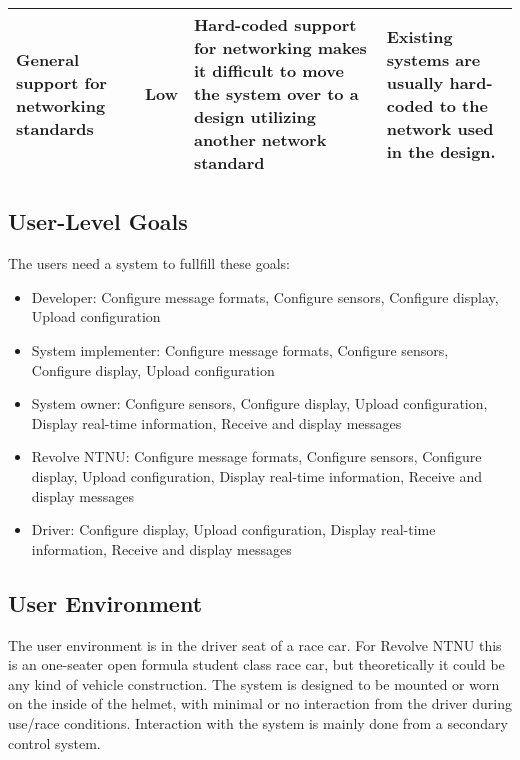 \begin{table}\small
\begin{tabularx}{\textwidth}{|X|l|X|X|}
        \hline
	General support for networking standards
		& Low
			& Hard-coded support for networking makes it difficult to move the system
			over to a design utilizing another network standard
				& Existing systems are usually hard-coded to the network used in the
				design. \\
	\hline
\end{tabularx}
\end{table}
\clearpage

\subsection{User-Level Goals}
The users need a system to fullfill these goals:
\begin{itemize}
	\item Developer: Configure message formats, Configure sensors, Configure
	display, Upload configuration
	\item System implementer: Configure message formats, Configure sensors, Configure
	display, Upload configuration
	\item System owner: Configure sensors, Configure
	display, Upload configuration, Display real-time information, Receive and display messages
	\item Revolve NTNU: Configure message formats, Configure sensors, Configure
	display, Upload configuration, Display real-time information, Receive and display messages
	\item Driver: Configure
	display, Upload configuration, Display real-time information, Receive and display messages
\end{itemize}

\subsection{User Environment}
The user environment is in the driver seat of a race car. For Revolve NTNU
this is an one-seater open formula student class race car, but theoretically it
could be any kind of vehicle construction. The system is designed to be mounted
or worn on the inside of the helmet, with minimal or no interaction from the
driver during use/race conditions. Interaction with the system is mainly done
from a secondary control system.
